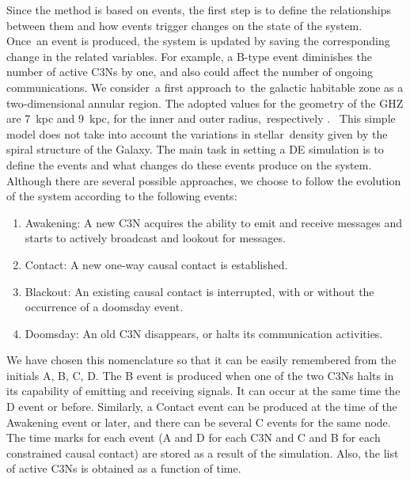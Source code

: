 \documentclass[crop]{CSLB}
\newcommand{\ceti}{C3N}
\newcommand{\cetis}{C3Ns}
\newcommand{\blackout}{B event }
\newcommand{\doomsday}{D event }
\newcommand{\aawakening}{Awakening event }
\newcommand{\ccontact}{Contact event }
\newcommand{\contacts}{C events }
\begin{document}
Since the method is based on events, the first step is to define the
relationships between them and how events trigger changes on the state of the
system.
%
Once an event is produced, the system is updated by saving the corresponding
change in the related variables.
%
For example, a B-type event diminishes the number of active \cetis{} by one,
and also could affect the number of ongoing communications.
%
We consider a first approach to the galactic habitable zone as a two-dimensional
annular region.
%
The adopted values for the geometry of the GHZ are 7~kpc and 9~kpc, for the
inner and outer radius, respectively \citep{lineweaver_galactic_2004}. 
%
This simple model does not take into account the variations in stellar density
given by the spiral structure of the Galaxy.
%
The main task in setting a DE simulation is to define the events and what
changes do these events produce on the system.
%
Although there are several possible approaches, we choose to follow the
evolution of the system according to the following events:

\begin{enumerate}
   \item[(A)] Awakening: A new \ceti{} acquires the ability to emit
      and receive messages and starts to actively broadcast and
      lookout for messages.
   \item[(C)] Contact: A new one-way causal contact is established.
   \item[(B)] Blackout: An existing causal contact is interrupted,
      with or without the occurrence of a doomsday event.
   \item[(D)] Doomsday: An old \ceti{} disappears, or halts its
      communication activities.
\end{enumerate}

We have chosen this nomenclature so that it can be easily remembered
from the initials A, B, C, D.
%
The \blackout is produced when one of the two \cetis{} halts in its
capability of emitting and receiving signals.
%
It can occur at the same time the \doomsday or before.
%
Similarly, a \ccontact can be produced at the time of the \aawakening
or later, and there can be several \contacts for the same node.
%
The time marks for each event (A and D for each \ceti{} and C and B
for each constrained causal contact) are stored as a result of the simulation.
%
Also, the list of active \cetis{} is obtained as a function of time.
%
%
%
\end{document}
